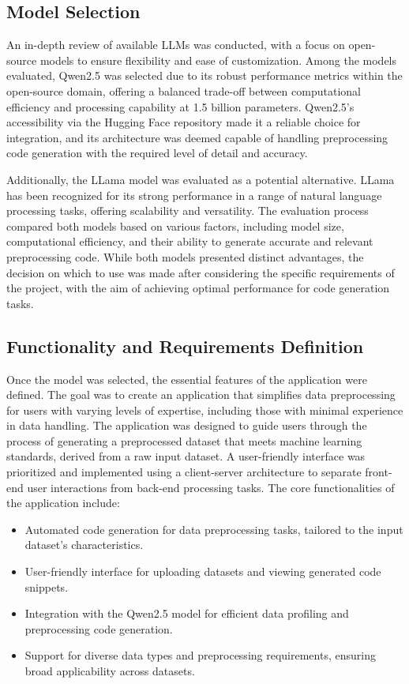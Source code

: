 \subsection{Model Selection}
An in-depth review of available LLMs was conducted, with a focus on open-source models to ensure flexibility and ease of customization. Among the models evaluated, Qwen2.5 was selected due to its robust performance metrics within the open-source domain, offering a balanced trade-off between computational efficiency and processing capability at 1.5 billion parameters. Qwen2.5's accessibility via the Hugging Face repository made it a reliable choice for integration, and its architecture was deemed capable of handling preprocessing code generation with the required level of detail and accuracy.

Additionally, the LLama model was evaluated as a potential alternative. LLama has been recognized for its strong performance in a range of natural language processing tasks, offering scalability and versatility. The evaluation process compared both models based on various factors, including model size, computational efficiency, and their ability to generate accurate and relevant preprocessing code. While both models presented distinct advantages, the decision on which to use was made after considering the specific requirements of the project, with the aim of achieving optimal performance for code generation tasks.

\subsection{Functionality and Requirements Definition}
Once the model was selected, the essential features of the application were defined. The goal was to create an application that simplifies data preprocessing for users with varying levels of expertise, including those with minimal experience in data handling. The application was designed to guide users through the process of generating a preprocessed dataset that meets machine learning standards, derived from a raw input dataset. A user-friendly interface was prioritized and implemented using a client-server architecture to separate front-end user interactions from back-end processing tasks.
The core functionalities of the application include:
\begin{itemize}
    \item Automated code generation for data preprocessing tasks, tailored to the input dataset's characteristics.
    \item User-friendly interface for uploading datasets and viewing generated code snippets.
    \item Integration with the Qwen2.5 model for efficient data profiling and preprocessing code generation.
    \item Support for diverse data types and preprocessing requirements, ensuring broad applicability across datasets.
\end{itemize}

